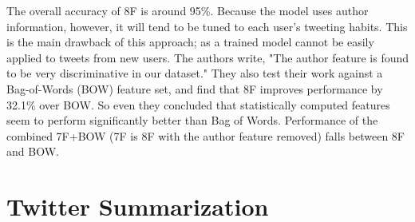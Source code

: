 The overall accuracy of 8F is around 95\%. Because the model uses author information, however, it will tend to be tuned to each user's tweeting habits. This is the main drawback of this approach; as a trained model cannot be easily applied to tweets from new users. The authors write, "The author feature is found to be very discriminative in our dataset." They also test their work against a Bag-of-Words (BOW) feature set, and find that 8F improves performance by 32.1\% over BOW. So even they concluded that statistically computed features seem to perform significantly better than Bag of Words. Performance of the combined 7F+BOW (7F is 8F with the author feature removed) falls between 8F and BOW. 

\section{Twitter Summarization}
